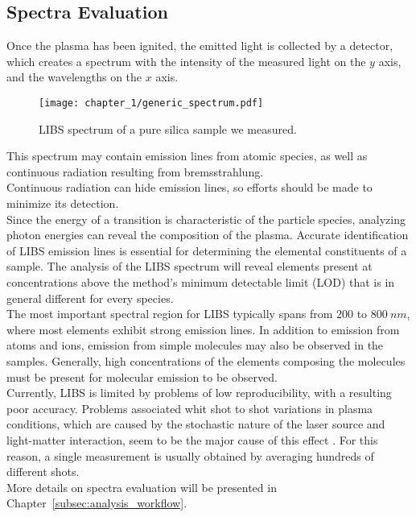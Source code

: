 \subsection{Spectra Evaluation}
\label{subsec:spectra_evaluation}
Once the plasma has been ignited, the emitted light is collected by a detector, which creates a spectrum with the intensity of the measured light on the $y$ axis, and the wavelengths on the $x$ axis. 
\begin{figure}[H]
    \centering
    \texttt{[image: chapter\_1/generic\_spectrum.pdf]}
    \vspace*{-30pt}
    \caption{LIBS spectrum of a pure silica sample we measured.}
    \label{fig:generic_spectrum}
\end{figure}
This spectrum may contain emission lines from atomic species, as well as continuous radiation resulting from bremsstrahlung.
\\
Continuous radiation can hide emission lines, so efforts should be made to minimize its detection. 
\\
Since the energy of a transition is characteristic of the particle species, analyzing photon energies can reveal the composition of the plasma.
Accurate identification of LIBS emission lines is essential for determining the elemental constituents of a sample. The analysis of the LIBS spectrum will reveal elements present at concentrations above the method's minimum detectable limit (LOD) \cite{elhaddadGoodPracticesLIBS2014} that is in general different for every species.
\\
The most important spectral region for LIBS typically spans from 200 to $800\: nm$, where most elements exhibit strong emission lines. In addition to emission from atoms and ions, emission from simple molecules may also be observed in the samples. Generally, high concentrations of the elements composing the molecules must be present for molecular emission to be observed.
\\
Currently, LIBS is limited by problems of low reproducibility, with a resulting poor accuracy. Problems associated whit shot to shot variations in plasma conditions, which are caused by the stochastic nature of the laser source and light-matter interaction, seem to be the major cause of this effect \cite{michelReviewApplicationsSingleshot2010}. For this reason, a single measurement is usually obtained by averaging hundreds of different shots.
\\
More details on spectra evaluation will be presented in Chapter~\ref{subsec:analysis_workflow}.

